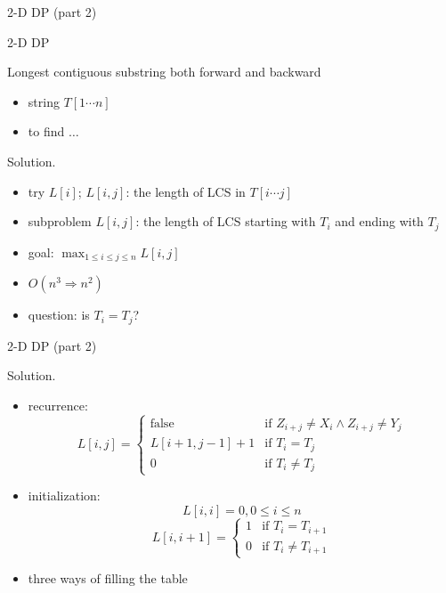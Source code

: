 \begin{frame}{2-D DP (part 2)}
  \begin{exampleblock}{2-D DP}
    \begin{exampleblock}{Longest contiguous substring both forward and backward }
      \begin{itemize}
	\item string $T[1 \cdots n]$
	\item to find $\ldots$
      \end{itemize}
    \end{exampleblock}
  \end{exampleblock}

  \begin{block}{Solution.}
    \begin{itemize}
      \item try $L[i]$; $L[i,j]$: the length of LCS in $T[i \cdots j]$
      \item subproblem $L[i,j]$: the length of LCS starting with $T_{i}$ and ending with $T_{j}$
      \item goal: $\max_{1 \le i \le j \le n} L[i,j]$
      \item $O(n^{3} \Rightarrow n^{2})$
      \item question: is $T_{i} = T_{j}$?
    \end{itemize}
  \end{block}
\end{frame}
\begin{frame}{2-D DP (part 2)}
  \begin{block}{Solution.}
    \begin{itemize}
      \item recurrence: 
	\begin{displaymath}
	  L[i,j] = \left\{ \begin{array}{ll}
	    \text{false} & \textrm{if $Z_{i+j} \neq X_{i} \land Z_{i+j} \neq Y_{j}$}\\
	    L[i+1,j-1] + 1 & \textrm{if $T_{i} = T_{j}$}\\
	    0 & \textrm{if $T_{i} \neq T_{j}$}
	  \end{array} \right.
	\end{displaymath}
      \item initialization: 
	\[ L[i,i] = 0, 0 \le i \le n \]
	\begin{displaymath}
	  L[i,i+1] = \left\{ \begin{array}{ll}
	    1 & \textrm{if $T_{i} = T_{i+1}$}\\
	    0 & \textrm{if $T_{i} \neq T_{i+1}$}
	  \end{array} \right.
	\end{displaymath}
      \item three ways of filling the table
    \end{itemize}
  \end{block}
\end{frame}

